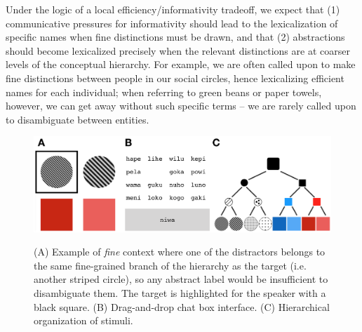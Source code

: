 \documentclass[10pt,letterpaper]{article}
\begin{document}
Under the logic of a local efficiency/informativity tradeoff, we expect that 
(1) communicative pressures for informativity should lead to the lexicalization of specific names when fine distinctions must be drawn, and that 
(2) abstractions should become lexicalized precisely when the relevant distinctions are at coarser levels of the conceptual hierarchy. 
For example, we are often called upon to make fine distinctions between people in our social circles, hence lexicalizing efficient names for each individual; when referring to green beans or paper towels, however, we can get away without such specific terms -- we are rarely called upon to disambiguate between entities. %

\begin{figure}[t]
\begin{center}
{\includegraphics[scale=.65]{fig.png}}
{\caption{\footnotesize{(A) Example of \emph{fine} context where one of the distractors belongs to the same fine-grained branch of the hierarchy as the target (i.e. another striped circle), so any abstract label would be insufficient to disambiguate them. The target is highlighted for the speaker with a black square. (B) Drag-and-drop chat box interface. (C) Hierarchical organization of stimuli.\label{exp}}}}
\end{center}
\end{figure}
\end{document}
